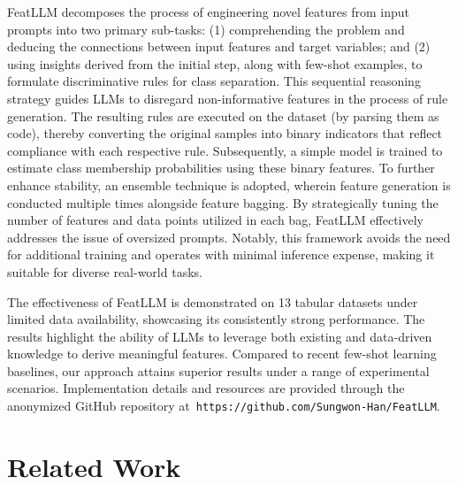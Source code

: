 \textsf{FeatLLM} decomposes the process of engineering novel features from input prompts into two primary sub-tasks: (1) comprehending the problem and deducing the connections between input features and target variables; and (2) using insights derived from the initial step, along with few-shot examples, to formulate discriminative rules for class separation. This sequential reasoning strategy guides LLMs to disregard non-informative features in the process of rule generation. The resulting rules are executed on the dataset (by parsing them as code), thereby converting the original samples into binary indicators that reflect compliance with each respective rule. Subsequently, a simple model is trained to estimate class membership probabilities using these binary features. To further enhance stability, an ensemble technique is adopted, wherein feature generation is conducted multiple times alongside feature bagging. By strategically tuning the number of features and data points utilized in each bag, \textsf{FeatLLM} effectively addresses the issue of oversized prompts. Notably, this framework avoids the need for additional training and operates with minimal inference expense, making it suitable for diverse real-world tasks.

The effectiveness of \textsf{FeatLLM} is demonstrated on 13 tabular datasets under limited data availability, showcasing its consistently strong performance. The results highlight the ability of LLMs to leverage both existing and data-driven knowledge to derive meaningful features. Compared to recent few-shot learning baselines, our approach attains superior results under a range of experimental scenarios. Implementation details and resources are provided through the anonymized GitHub repository at~\texttt{https://github.com/Sungwon-Han/FeatLLM}.

\section{Related Work}

